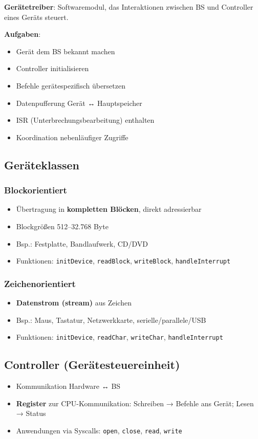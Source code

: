 \documentclass[11pt, a4paper]{article}
\begin{document}
\textbf{Gerätetreiber}: Softwaremodul, das Interaktionen zwischen BS und Controller eines Geräts steuert.


\textbf{Aufgaben}:

\begin{itemize}
  \item Gerät dem BS bekannt machen
  \item Controller initialisieren
  \item Befehle gerätespezifisch übersetzen
  \item Datenpufferung Gerät ↔ Hauptspeicher
  \item ISR (Unterbrechungsbearbeitung) enthalten
  \item Koordination nebenläufiger Zugriffe
\end{itemize}


\subsection{Geräteklassen}


\subsubsection{Blockorientiert}
\begin{itemize}
  \item Übertragung in \textbf{kompletten Blöcken}, direkt adressierbar
  \item Blockgrößen 512–32.768 Byte
  \item Bsp.: Festplatte, Bandlaufwerk, CD/DVD
  \item Funktionen: \texttt{initDevice}, \texttt{readBlock}, \texttt{writeBlock}, \texttt{handleInterrupt}
\end{itemize}


\subsubsection{Zeichenorientiert}
\begin{itemize}
  \item \textbf{Datenstrom (stream)} aus Zeichen
  \item Bsp.: Maus, Tastatur, Netzwerkkarte, serielle/parallele/USB
  \item Funktionen: \texttt{initDevice}, \texttt{readChar}, \texttt{writeChar}, \texttt{handleInterrupt}
\end{itemize}


\subsection{Controller (Gerätesteuereinheit)}
\begin{itemize}
  \item Kommunikation Hardware ↔ BS
  \item \textbf{Register} zur CPU-Kommunikation: Schreiben → Befehle ans Gerät; Lesen → Status
  \item Anwendungen via Syscalls: \texttt{open}, \texttt{close}, \texttt{read}, \texttt{write}
\end{itemize}
\end{document}
